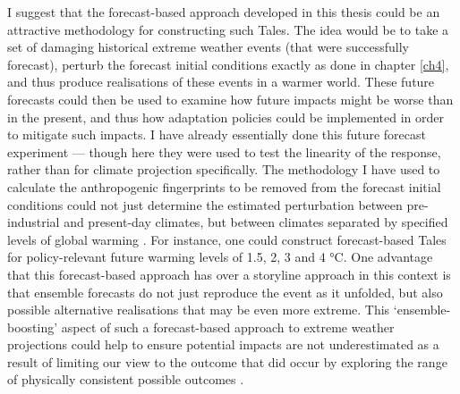       I suggest that the forecast-based approach developed in this thesis could be an attractive methodology for constructing such Tales. The idea would be to take a set of damaging historical extreme weather events (that were successfully forecast), perturb the forecast initial conditions exactly as done in chapter \ref{ch4}, and thus produce realisations of these events in a warmer world. These future forecasts could then be used to examine how future impacts might be worse than in the present, and thus how adaptation policies could be implemented in order to mitigate such impacts. I have already essentially done this future forecast experiment --- though here they were used to test the linearity of the response, rather than for climate projection specifically. The methodology I have used to calculate the anthropogenic fingerprints to be removed from the forecast initial conditions could not just determine the estimated perturbation between pre-industrial and present-day climates, but between climates separated by specified levels of global warming \citep{hasselmann_optimal_1993}. For instance, one could construct forecast-based Tales for policy-relevant future warming levels of 1.5, 2, 3 and 4 °C. One advantage that this forecast-based approach has over a storyline approach \citep[eg.][]{benitez_july_2022} in this context is that ensemble forecasts do not just reproduce the event as it unfolded, but also possible alternative realisations that may be even more extreme. This `ensemble-boosting' aspect of such a forecast-based approach to extreme weather projections could help to ensure potential impacts are not underestimated as a result of limiting our view to the outcome that did occur by exploring the range of physically consistent possible outcomes \citep{gessner_very_2021}.
      
